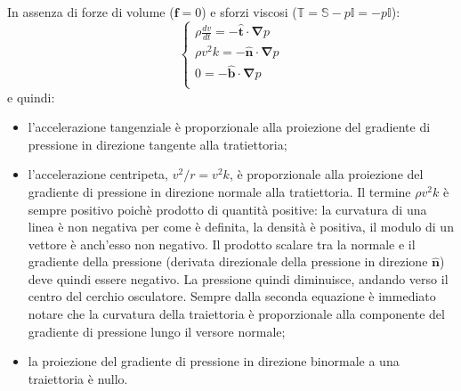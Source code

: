 \noindent
In assenza di forze di volume ($\bm{f}=0$) e sforzi viscosi
($\mathbb{T}=\mathbb{S}-p\mathbb{I}=-p\mathbb{I}$):
\begin{equation}
 \begin{cases}
  \rho \frac{dv}{dt} = - \bm{\hat{t}} \cdot \bm{\nabla} p \\
  \rho v^2 k         = - \bm{\hat{n}} \cdot \bm{\nabla} p \\
  0                  = - \bm{\hat{b}} \cdot \bm{\nabla} p \\
 \end{cases}
\end{equation}
%
e quindi:
\begin{itemize}
 \item l'accelerazione tangenziale è proporzionale alla proiezione del gradiente di pressione in direzione tangente alla tratiettoria;
 \item l'accelerazione centripeta, $v^2/r = v^2 k$, è proporzionale alla proiezione del gradiente di pressione in direzione normale alla tratiettoria. Il termine $\rho v^2 k$ è sempre positivo poichè prodotto di quantità positive: la curvatura di una linea è non negativa per come è definita, la densità è positiva, il modulo di un vettore è anch'esso non negativo. Il prodotto scalare tra la normale e il gradiente della pressione (derivata direzionale della pressione in direzione $\bm{\hat{n}}$) deve quindi essere negativo. La pressione quindi diminuisce, andando verso il centro del cerchio osculatore. Sempre dalla seconda equazione è immediato notare che la curvatura della traiettoria è proporzionale alla componente del gradiente di pressione lungo il versore normale;
 \item la proiezione del gradiente di pressione in direzione binormale a una traiettoria è nullo.
\end{itemize}

